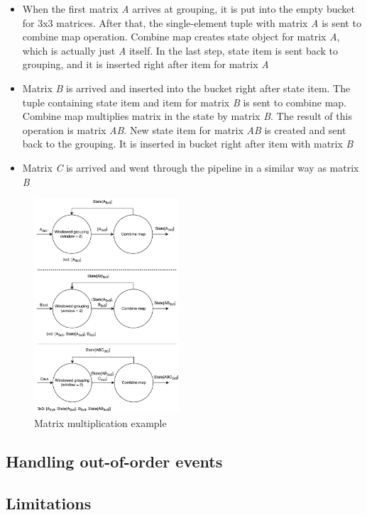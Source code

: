 \begin{itemize}
    \item When the first matrix {\it A} arrives at grouping, it is put into the empty bucket for 3x3 matrices. After that, the single-element tuple with matrix {\it A} is sent to combine map operation. Combine map creates state object for matrix {\it A}, which is actually just {\it A} itself. In the last step, state item is sent back to grouping, and it is inserted right after item for matrix {\it A}
    \item Matrix {\it B} is arrived and inserted into the bucket right after state item. The tuple containing state item and item for matrix {\it B} is sent to combine map. Combine map multiplies matrix in the state by matrix {\it B}. The result of this operation is matrix {\it AB}. New state item for matrix {\it AB} is created and sent back to the grouping. It is inserted in bucket right after item with matrix {\it B}
    \item Matrix {\it C} is arrived and went through the pipeline in a similar way as matrix {\it B}
\end{itemize}

\begin{figure}[htbp]
  \centering
  \includegraphics[width=0.48\textwidth]{pics/matrix-example}
  \caption{Matrix multiplication example}
  \label {matrix-example}
\end{figure}

\subsection{Handling out-of-order events}

\subsection{Limitations}




